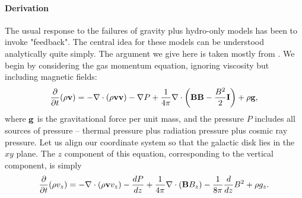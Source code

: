 \paragraph{Derivation}

The usual response to the failures of gravity plus hydro-only models has been to invoke "feedback". The central idea for these models can be understood analytically quite simply. The argument we give here is taken mostly from \citet{ostriker11a}. We begin by considering the gas momentum equation, ignoring viscosity but including magnetic fields:
\begin{equation}
\frac{\partial}{\partial t} (\rho\mathbf{v}) = - \nabla\cdot (\rho\mathbf{v}\mathbf{v}) - \nabla P + \frac{1}{4\pi} \nabla \cdot \left(\mathbf{B}\mathbf{B} - \frac{B^2}{2} \mathbf{I}\right) + \rho \mathbf{g},
\end{equation}
where $\mathbf{g}$ is the gravitational force per unit mass, and the pressure $P$ includes all sources of pressure -- thermal pressure plus radiation pressure plus cosmic ray pressure. Let us align our coordinate system so that the galactic disk lies in the $xy$ plane. The $z$ component of this equation, corresponding to the vertical component, is simply
\begin{equation}
\frac{\partial}{\partial t} (\rho v_z) = - \nabla\cdot (\rho\mathbf{v} v_z) - \frac{dP}{dz} + \frac{1}{4\pi} \nabla \cdot \left(\mathbf{B} B_z\right) - \frac{1}{8\pi} \frac{d}{dz} B^2 + \rho g_z.
\end{equation}

